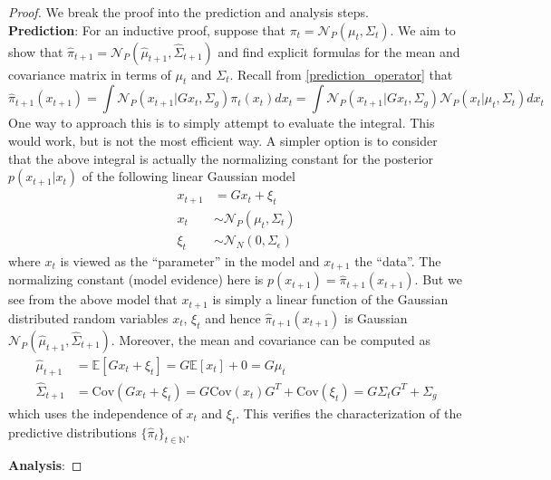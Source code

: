 \documentclass[12pt]{article}
\newcommand{\E}{\mathbb{E}}
\newcommand{\Cov}{\mathrm{Cov}}
\begin{document}
\begin{proof} 
We break the proof into the prediction and analysis steps. \\

\noindent
\textbf{Prediction}: For an inductive proof, suppose that $\pi_t = \mathcal{N}_P(\mu_t, \Sigma_t)$. We aim to show that 
$\hat{\pi}_{t + 1} = \mathcal{N}_P(\hat{\mu}_{t + 1}, \hat{\Sigma}_{t + 1})$ and find explicit formulas for the mean and covariance 
matrix in terms of $\mu_t$ and $\Sigma_t$. Recall from \ref{prediction_operator} that 
\[\hat{\pi}_{t + 1}(x_{t+1}) = \int \mathcal{N}_P(x_{t+1}|Gx_t, \Sigma_g) \pi_t(x_t) dx_t = \int \mathcal{N}_P(x_{t+1}|Gx_t, \Sigma_g) \mathcal{N}_P(x_{t}|\mu_t, \Sigma_t) dx_t \]
One way to approach this is to simply attempt to evaluate the integral. This would work, but is not the most efficient way. A simpler option 
is to consider that the above integral is actually the normalizing constant for the posterior $p(x_{t+1}|x_t)$ of the following linear Gaussian model 
\begin{align*}
x_{t + 1} &= Gx_t + \xi_t \\
x_t &\sim \mathcal{N}_P(\mu_t, \Sigma_t) \\
\xi_t &\sim \mathcal{N}_N(0, \Sigma_\epsilon)
\end{align*}
where $x_t$ is viewed as the ``parameter'' in the model and $x_{t+1}$ the ``data''. The normalizing constant (model evidence) here is 
$p(x_{t + 1}) = \hat{\pi}_{t + 1}(x_{t+1})$. But we see from the above model that $x_{t + 1}$ is simply a linear function of the Gaussian distributed 
random variables $x_t$, $\xi_t$ and hence $\hat{\pi}_{t + 1}(x_{t+1})$ is Gaussian $\mathcal{N}_P(\hat{\mu}_{t + 1}, \hat{\Sigma}_{t + 1})$. 
Moreover, the mean and covariance can be computed as 
\begin{align*}
\hat{\mu}_{t + 1} &= \E\left[Gx_t + \xi_t\right] = G\E[x_t] + 0 = G \mu_t \\
\hat{\Sigma}_{t + 1} &= \Cov(Gx_t + \xi_t) = G \Cov(x_t) G^T + \Cov(\xi_t) = G \Sigma_t G^T + \Sigma_{g}
\end{align*}
which uses the independence of $x_t$ and $\xi_t$. This verifies the characterization of the predictive distributions $\{\hat{\pi}_t\}_{t \in \mathbb{N}}$. 

\bigskip
\noindent
\textbf{Analysis}:

\end{proof}
\end{document}
